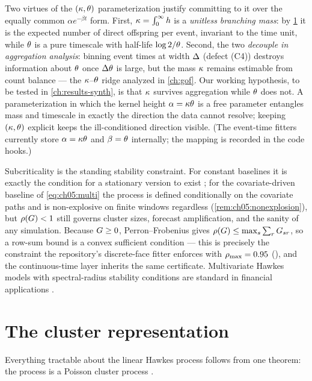 Two virtues of the $(\kappa,\theta)$ parameterization justify committing
to it over the equally common $\alpha e^{-\beta t}$ form. First,
$\kappa = \int_0^\infty h$ is a \emph{unitless branching mass}: by
\cref{ch05:sec:cluster} it is the expected number of direct offspring per
event, invariant to the time unit, while $\theta$ is a pure timescale with
half-life $\log 2/\theta$. Second, the two \emph{decouple in aggregation
analysis}: binning event times at width $\Delta$ (defect (C4)) destroys
information about $\theta$ once $\Delta\theta$ is large, but the mass
$\kappa$ remains estimable from count balance --- the
$\kappa$--$\theta$ ridge analyzed in \cref{ch:gof}. Our working
hypothesis, to be tested in \cref{ch:results-synth}, is that $\kappa$
survives aggregation while $\theta$ does not. A parameterization in which the kernel height
$\alpha = \kappa\theta$ is a free parameter entangles mass and timescale
in exactly the direction the data cannot resolve; keeping
$(\kappa,\theta)$ explicit keeps the ill-conditioned direction visible.
(The event-time fitters currently store $\alpha=\kappa\theta$ and $\beta
= \theta$ internally; the mapping is recorded in the code hooks.)

Subcriticality is the standing stability constraint. For constant
baselines it is exactly the condition for a stationary version to exist
\citep{hawkes1971,bremaud1996}; for the covariate-driven baseline of
\cref{eq:ch05:multi} the process is defined conditionally on the covariate
paths and is non-explosive on finite windows regardless
(\cref{rem:ch05:nonexplosion}), but $\rho\!\left(G\right)<1$ still governs
cluster sizes, forecast amplification, and the sanity of any simulation.
Because $G \ge 0$, Perron--Frobenius gives $\rho\!\left(G\right) \le \max_s
\sum_r G_{sr}$, so a row-sum bound is a convex sufficient condition
--- this is precisely the constraint the repository's discrete-face fitter
enforces with $\rho_{\max} = 0.95$ (), and the
continuous-time layer inherits the same certificate. Multivariate Hawkes
models with spectral-radius stability conditions are standard in financial
applications \citep{embrechts2011,bacry2015}.

\section{The cluster representation}\label{ch05:sec:cluster}

Everything tractable about the linear Hawkes process follows from one
theorem: the process is a Poisson cluster process
\citep{hawkesoakes1974}.

